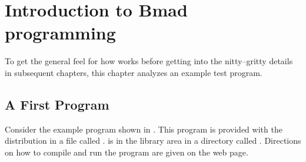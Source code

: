 \chapter{Introduction to Bmad programming}
\label{c:program.info}

To get the general feel for how \bmad works before
getting into the nitty--gritty details in subsequent chapters, this
chapter analyzes an example test program.

\section{A First Program}
\label{s:first.program}

Consider the example program shown in .  This program
is provided with the \bmad distribution in a file called
.  is in the
library area in a directory called
. Directions on how to compile and
run the program are given on the \bmad web page\cite{b:bmad.web}. 

